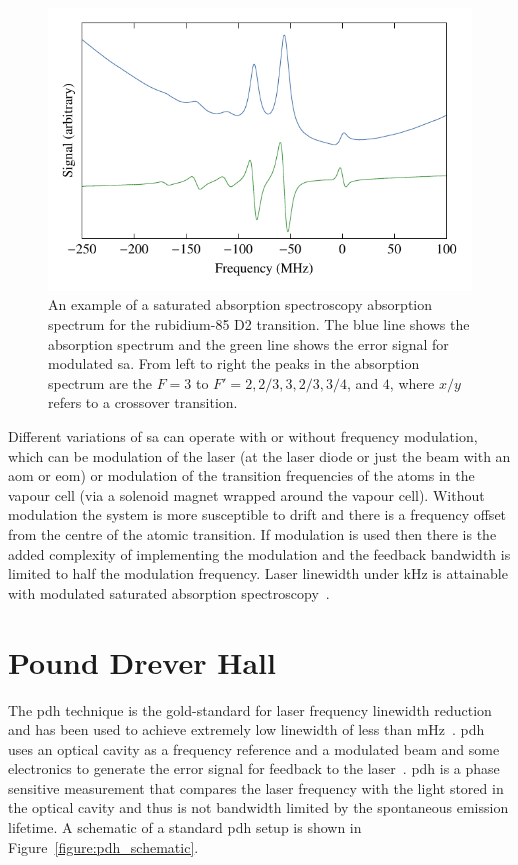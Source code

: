 \begin{figure}
    \center
    \includegraphics{part1/Figs/SatAbsSpectrum.pdf}
    \caption[Saturated absorption spectroscopy absorption spectrum.]{An example of a saturated absorption spectroscopy absorption spectrum for the rubidium-85 D2 transition.
    The blue line shows the absorption spectrum and the green line shows the error signal for modulated \gls{sa}.
    From left to right the peaks in the absorption spectrum are the $F=3$ to $F'=2,2/3,3,2/3,3/4$, and $4$, where $x/y$ refers to a crossover transition.}
    \label{figure:satabsspectrum}
\end{figure}

Different variations of \gls{sa} can operate with or without frequency modulation, which can be modulation of the laser (at the laser diode or just the beam with an \gls{aom} or \gls{eom}) or modulation of the transition frequencies of the atoms in the vapour cell (via a solenoid magnet wrapped around the vapour cell).
Without modulation the system is more susceptible to drift and there is a frequency offset from the centre of the atomic transition.
If modulation is used then there is the added complexity of implementing the modulation and the feedback bandwidth is limited to half the modulation frequency.
Laser linewidth under \unit[150]{kHz} is attainable with modulated saturated absorption spectroscopy~\cite{saliba_linewidths_2009}.

\section{Pound Drever Hall}
The \gls{pdh} technique is the gold-standard for laser frequency linewidth reduction and has been used to achieve extremely low linewidth of less than \unit[40]{mHz}~\cite{kessler_sub-40-mhz-linewidth_2012}.
\Gls{pdh} uses an optical cavity as a frequency reference and a modulated beam and some electronics to generate the error signal for feedback to the laser~\cite{drever_laser_1983,black_introduction_2001}.
\Gls{pdh} is a phase sensitive measurement that compares the laser frequency with the light stored in the optical cavity and thus is not bandwidth limited by the spontaneous emission lifetime.
A schematic of a standard \gls{pdh} setup is shown in Figure~\ref{figure:pdh_schematic}.

